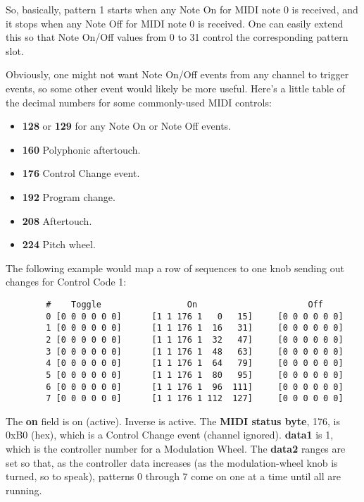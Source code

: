    So, basically, pattern 1 starts when any Note On for MIDI note 0
   is received, and it stops when any Note Off for MIDI note 0 is received.  
   One can easily extend this so that Note On/Off values from 0 to 31
   control the corresponding pattern slot.

   Obviously, one might not want Note On/Off events from any channel to trigger
   events, so some other event would likely be more useful.
   Here's a little table of the decimal numbers for some commonly-used MIDI
   controls:

   \begin{itemize}
      \item \textbf{128} or \textbf{129} for any Note On or Note Off events.
      \item \textbf{160} Polyphonic aftertouch.
      \item \textbf{176} Control Change event.
      \item \textbf{192} Program change.
      \item \textbf{208} Aftertouch.
      \item \textbf{224} Pitch wheel.
   \end{itemize}

   The following example would map a row of sequences to one knob sending
   out changes for Control Code 1:

   \begin{verbatim}
        #    Toggle                 On                      Off
        0 [0 0 0 0 0 0]      [1 1 176 1   0   15]     [0 0 0 0 0 0]
        1 [0 0 0 0 0 0]      [1 1 176 1  16   31]     [0 0 0 0 0 0]
        2 [0 0 0 0 0 0]      [1 1 176 1  32   47]     [0 0 0 0 0 0]
        3 [0 0 0 0 0 0]      [1 1 176 1  48   63]     [0 0 0 0 0 0]
        4 [0 0 0 0 0 0]      [1 1 176 1  64   79]     [0 0 0 0 0 0]
        5 [0 0 0 0 0 0]      [1 1 176 1  80   95]     [0 0 0 0 0 0]
        6 [0 0 0 0 0 0]      [1 1 176 1  96  111]     [0 0 0 0 0 0]
        7 [0 0 0 0 0 0]      [1 1 176 1 112  127]     [0 0 0 0 0 0]
   \end{verbatim}

   The \textbf{on} field is on (active).  Inverse is active.  The
   \textbf{MIDI status byte}, 176, is 0xB0 (hex), which is a Control Change
   event (channel ignored).  \textbf{data1} is 1, which is the controller
   number for a Modulation Wheel.  The \textbf{data2} ranges are set so
   that, as the controller data increases (as the modulation-wheel knob is
   turned, so to speak), patterns 0 through 7 come on one at a time until
   all are running.

